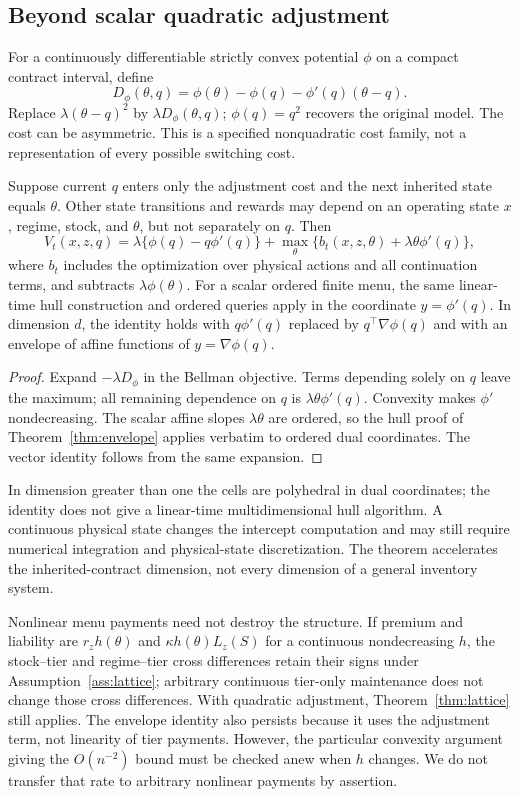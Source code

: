 \subsection{Beyond scalar quadratic adjustment}\label{sec:bregman}
For a continuously differentiable strictly convex potential $\phi$ on a compact contract interval, define
\[
 D_\phi(\theta,q)=\phi(\theta)-\phi(q)-\phi'(q)(\theta-q).
\]
Replace $\lambda(\theta-q)^2$ by $\lambda D_\phi(\theta,q)$; $\phi(q)=q^2$ recovers the original model. The cost can be asymmetric. This is a specified nonquadratic cost family, not a representation of every possible switching cost.
\begin{theorem}\label{thm:bregman}
Suppose current $q$ enters only the adjustment cost and the next inherited state equals $\theta$. Other state transitions and rewards may depend on an operating state $x$, regime, stock, and $\theta$, but not separately on $q$. Then
\begin{equation}\label{eq:bregman}
 V_t(x,z,q)=\lambda\{\phi(q)-q\phi'(q)\}
       +\max_{\theta}\{b_t(x,z,\theta)+\lambda\theta\phi'(q)\},
\end{equation}
where $b_t$ includes the optimization over physical actions and all continuation terms, and subtracts $\lambda\phi(\theta)$. For a scalar ordered finite menu, the same linear-time hull construction and ordered queries apply in the coordinate $y=\phi'(q)$. In dimension $d$, the identity holds with $q\phi'(q)$ replaced by $q^\top\nabla\phi(q)$ and with an envelope of affine functions of $y=\nabla\phi(q)$.
\end{theorem}
\begin{proof}
Expand $-\lambda D_\phi$ in the Bellman objective. Terms depending solely on $q$ leave the maximum; all remaining dependence on $q$ is $\lambda\theta\phi'(q)$. Convexity makes $\phi'$ nondecreasing. The scalar affine slopes $\lambda\theta$ are ordered, so the hull proof of Theorem~\ref{thm:envelope} applies verbatim to ordered dual coordinates. The vector identity follows from the same expansion.\end{proof}
In dimension greater than one the cells are polyhedral in dual coordinates; the identity does not give a linear-time multidimensional hull algorithm. A continuous physical state changes the intercept computation and may still require numerical integration and physical-state discretization. The theorem accelerates the inherited-contract dimension, not every dimension of a general inventory system.

Nonlinear menu payments need not destroy the structure. If premium and liability are $r_z h(\theta)$ and $\kappa h(\theta)L_z(S)$ for a continuous nondecreasing $h$, the stock--tier and regime--tier cross differences retain their signs under Assumption~\ref{ass:lattice}; arbitrary continuous tier-only maintenance does not change those cross differences. With quadratic adjustment, Theorem~\ref{thm:lattice} still applies. The envelope identity also persists because it uses the adjustment term, not linearity of tier payments. However, the particular convexity argument giving the $O(n^{-2})$ bound must be checked anew when $h$ changes. We do not transfer that rate to arbitrary nonlinear payments by assertion.
